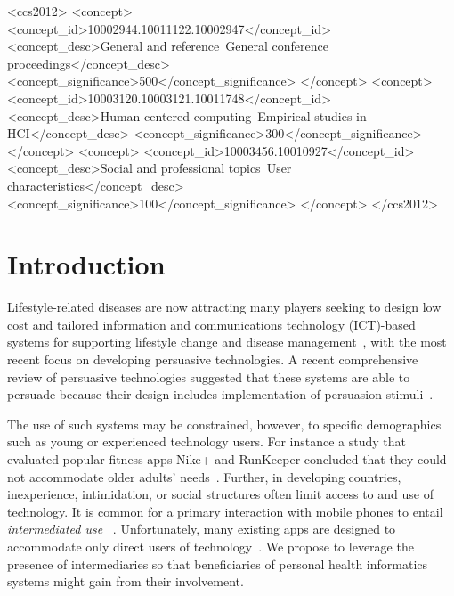 \documentclass{sig-alternate}
\begin{document}
\begin{CCSXML}
<ccs2012>
<concept>
<concept_id>10002944.10011122.10002947</concept_id>
<concept_desc>General and reference~General conference proceedings</concept_desc>
<concept_significance>500</concept_significance>
</concept>
<concept>
<concept_id>10003120.10003121.10011748</concept_id>
<concept_desc>Human-centered computing~Empirical studies in HCI</concept_desc>
<concept_significance>300</concept_significance>
</concept>
<concept>
<concept_id>10003456.10010927</concept_id>
<concept_desc>Social and professional topics~User characteristics</concept_desc>
<concept_significance>100</concept_significance>
</concept>
</ccs2012>
\end{CCSXML}


%
%
%
%
\printccsdesc



\section{Introduction} 
Lifestyle-related diseases are now attracting many players seeking to design low cost and tailored information and communications technology (ICT)-based systems for supporting lifestyle change and disease management~\cite{arsand:mobile}, with the most recent focus on developing persuasive technologies. A recent comprehensive review of persuasive technologies suggested that these systems are able to persuade because their design includes implementation of persuasion stimuli~\cite{hamari2014persuasive}.

The use of such systems may be constrained, however, to specific demographics such as young or experienced technology users. For instance a study that evaluated popular fitness apps Nike+ and RunKeeper concluded that they could not accommodate older adults' needs~\cite{silva2014:smartphones}. Further, in developing countries, inexperience, intimidation, or social structures often limit access to and use of technology. It is common for a primary interaction with mobile phones to entail \emph{intermediated use} ~\cite{sambasivan2010,kumar2015mobile,katule2016:leveraging}. Unfortunately, many existing apps are designed to accommodate only direct users of technology~\cite{sambasivan2010}. We propose to leverage the presence of intermediaries so that beneficiaries of personal health informatics systems might gain from their involvement.
\end{document}
